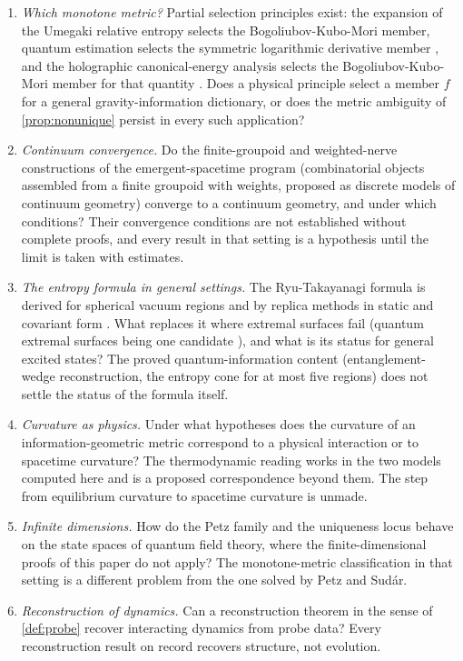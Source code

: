 \documentclass[11pt,letterpaper]{article}
\theoremstyle{definition}
\theoremstyle{remark}
\begin{document}
\begin{enumerate}
\item \emph{Which monotone metric?} Partial selection principles exist: the expansion of the Umegaki relative entropy selects the Bogoliubov-Kubo-Mori member, quantum estimation selects the symmetric logarithmic derivative member \cite{braunstein-caves, petz-1996}, and the holographic canonical-energy analysis selects the Bogoliubov-Kubo-Mori member for that quantity \cite{lashkari-vr}. Does a physical principle select a member $f$ for a general gravity-information dictionary, or does the metric ambiguity of \cref{prop:nonunique} persist in every such application?
\item \emph{Continuum convergence.} Do the finite-groupoid and weighted-nerve constructions of the emergent-spacetime program (combinatorial objects assembled from a finite groupoid with weights, proposed as discrete models of continuum geometry) converge to a continuum geometry, and under which conditions? Their convergence conditions are not established without complete proofs, and every result in that setting is a hypothesis until the limit is taken with estimates.
\item \emph{The entropy formula in general settings.} The Ryu-Takayanagi formula is derived for spherical vacuum regions and by replica methods in static and covariant form \cite{chc, lm, dlr}. What replaces it where extremal surfaces fail (quantum extremal surfaces being one candidate \cite{ew}), and what is its status for general excited states? The proved quantum-information content (entanglement-wedge reconstruction, the entropy cone for at most five regions) does not settle the status of the formula itself.
\item \emph{Curvature as physics.} Under what hypotheses does the curvature of an information-geometric metric correspond to a physical interaction or to spacetime curvature? The thermodynamic reading works in the two models computed here and is a proposed correspondence beyond them. The step from equilibrium curvature to spacetime curvature is unmade.
\item \emph{Infinite dimensions.} How do the Petz family and the uniqueness locus behave on the state spaces of quantum field theory, where the finite-dimensional proofs of this paper do not apply? The monotone-metric classification in that setting is a different problem from the one solved by Petz and Sud\'ar.
\item \emph{Reconstruction of dynamics.} Can a reconstruction theorem in the sense of \cref{def:probe} recover interacting dynamics from probe data? Every reconstruction result on record recovers structure, not evolution.
\end{enumerate}
\end{document}
